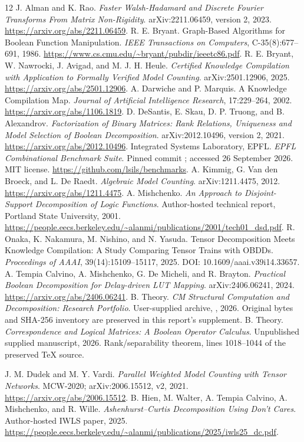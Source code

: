 \begin{thebibliography}{12}
 J. Alman and K. Rao. \emph{Faster Walsh-Hadamard and Discrete Fourier Transforms From Matrix Non-Rigidity}. arXiv:2211.06459, version 2, 2023. \url{https://arxiv.org/abs/2211.06459}.
 R. E. Bryant. Graph-Based Algorithms for Boolean Function Manipulation. \emph{IEEE Transactions on Computers}, C-35(8):677--691, 1986. \url{https://www.cs.cmu.edu/~bryant/pubdir/ieeetc86.pdf}.
 R. E. Bryant, W. Nawrocki, J. Avigad, and M. J. H. Heule. \emph{Certified Knowledge Compilation with Application to Formally Verified Model Counting}. arXiv:2501.12906, 2025. \url{https://arxiv.org/abs/2501.12906}.
 A. Darwiche and P. Marquis. A Knowledge Compilation Map. \emph{Journal of Artificial Intelligence Research}, 17:229--264, 2002. \url{https://arxiv.org/abs/1106.1819}.
 D. DeSantis, E. Skau, D. P. Truong, and B. Alexandrov. \emph{Factorization of Binary Matrices: Rank Relations, Uniqueness and Model Selection of Boolean Decomposition}. arXiv:2012.10496, version 2, 2021. \url{https://arxiv.org/abs/2012.10496}.
 Integrated Systems Laboratory, EPFL. \emph{EPFL Combinational Benchmark Suite}. Pinned commit ; accessed 26 September 2026. MIT license. \url{https://github.com/lsils/benchmarks}.
 A. Kimmig, G. Van den Broeck, and L. De Raedt. \emph{Algebraic Model Counting}. arXiv:1211.4475, 2012. \url{https://arxiv.org/abs/1211.4475}.
 A. Mishchenko. \emph{An Approach to Disjoint-Support Decomposition of Logic Functions}. Author-hosted technical report, Portland State University, 2001. \url{https://people.eecs.berkeley.edu/~alanmi/publications/2001/tech01_dsd.pdf}.
 R. Onaka, K. Nakamura, M. Nishino, and N. Yasuda. Tensor Decomposition Meets Knowledge Compilation: A Study Comparing Tensor Trains with OBDDs. \emph{Proceedings of AAAI}, 39(14):15109--15117, 2025. DOI: 10.1609/aaai.v39i14.33657.
 A. Tempia Calvino, A. Mishchenko, G. De Micheli, and R. Brayton. \emph{Practical Boolean Decomposition for Delay-driven LUT Mapping}. arXiv:2406.06241, 2024. \url{https://arxiv.org/abs/2406.06241}.
 B. Theory. \emph{CM Structural Computation and Decomposition: Research Portfolio}. User-supplied archive, , 2026. Original bytes and SHA-256 inventory are preserved in this report's supplement.
 B. Theory. \emph{Correspondence and Logical Matrices: A Boolean Operator Calculus}. Unpublished supplied manuscript, 2026. Rank/separability theorem, lines 1018--1044 of the preserved TeX source.

 J. M. Dudek and M. Y. Vardi. \emph{Parallel Weighted Model Counting with Tensor Networks}. MCW-2020; arXiv:2006.15512, v2, 2021. \url{https://arxiv.org/abs/2006.15512}.
 B. Hien, M. Walter, A. Tempia Calvino, A. Mishchenko, and R. Wille. \emph{Ashenhurst--Curtis Decomposition Using Don't Cares}. Author-hosted IWLS paper, 2025. \url{https://people.eecs.berkeley.edu/~alanmi/publications/2025/iwls25_dc.pdf}.

\end{thebibliography}
